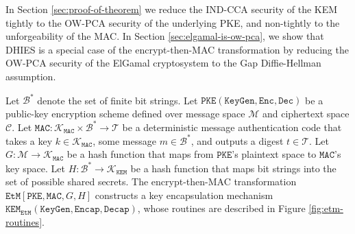 \documentclass[journal=tches,submission]{iacrtrans}
\newcommand{\pke}{\texttt{PKE}}
\newcommand{\keygen}{\texttt{KeyGen}}
\newcommand{\encrypt}{\texttt{Enc}}
\newcommand{\decrypt}{\texttt{Dec}}
\newcommand{\kem}{\texttt{KEM}}
\newcommand{\encap}{\texttt{Encap}}
\newcommand{\decap}{\texttt{Decap}}
\newcommand{\etm}{\texttt{EtM}}  %
\newcommand{\mac}{\texttt{MAC}}
\begin{document}
In Section \ref{sec:proof-of-theorem} we reduce the IND-CCA security of the KEM tightly to the OW-PCA security of the underlying PKE, and non-tightly to the unforgeability of the MAC. In Section \ref{sec:elgamal-is-ow-pca}, we show that DHIES is a special case of the encrypt-then-MAC transformation by reducing the OW-PCA security of the ElGamal cryptosystem to the Gap Diffie-Hellman assumption.

Let $\mathcal{B}^\ast$ denote the set of finite bit strings. Let $\pke(\keygen, \encrypt, \decrypt)$ be a public-key encryption scheme defined over message space $\mathcal{M}$ and ciphertext space $\mathcal{C}$. Let $\mac: \mathcal{K}_\mac \times \mathcal{B}^\ast \rightarrow \mathcal{T}$ be a deterministic message authentication code that takes a key $k \in \mathcal{K}_\mac$, some message $m \in \mathcal{B}^\ast$, and outputs a digest $t \in \mathcal{T}$. Let $G: \mathcal{M} \rightarrow \mathcal{K}_\mac$ be a hash function that maps from $\pke$'s plaintext space to $\mac$'s key space. Let $H: \mathcal{B}^\ast \rightarrow \mathcal{K}_\kem$ be a hash function that maps bit strings into the set of possible shared secrets. The encrypt-then-MAC transformation $\etm[\pke, \mac, G, H]$ constructs a key encapsulation mechanism $\kem_\etm(\keygen, \encap, \decap)$, whose routines are described in Figure \ref{fig:etm-routines}.
\end{document}
